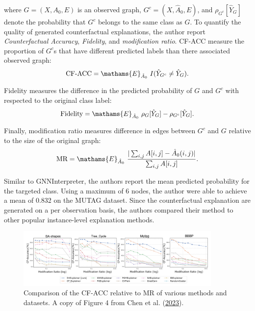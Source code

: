 \documentclass[
  11pt,
  letterpaper,
]{article}
\begin{document}
where \(G = (X, A_0, E)\) is an observed graph,
\(G^c = (X, \hat A_0, E)\), and \(\rho_{G^c}[\hat Y_{G}]\) denote the
probability that \(G^c\) belongs to the same class as \(G\). To quantify
the quality of generated counterfactual explanations, the author report
\emph{Counterfactual Accuracy}, \emph{Fidelity}, and \emph{modification
ratio}. CF-ACC measure the proportion of \(G^c\)s that have different
predicted labels than there associated observed graph: \begin{equation}
        \text{CF-ACC} = \mathams{E}_{\hat A_0} \ I(\hat Y_{G^c} \neq \hat Y_{G}).
\end{equation}

Fidelity measures the difference in the predicted probability of \(G\)
and \(G^c\) with respected to the original class label: \begin{equation}
    \text{Fidelity} = \mathams{E}_{\hat A_0} \ \rho_{G}[\hat Y_G] - \rho_{G^c}[\hat Y_G].
\end{equation}

Finally, modification ratio measures difference in edges between \(G^c\)
and \(G\) relative to the size of the original graph:
\begin{equation} \label{mod-ratio}
    \text{MR} = \mathams{E}_{\hat A_0} \ \dfrac{|\sum_{i, j} A[i, j] - \hat A_0(i, j)|}{\sum_{i, j} A[i, j]}. 
\end{equation}

\quad Similar to GNNInterpreter, the authors report the mean predicted
probability for the targeted class. Using a maximum of 6 nodes, the
author were able to achieve a mean of 0.832 on the MUTAG dataset. Since
the counterfactual explanation are generated on a per observation basis,
the authors compared their method to other popular instance-level
explanation methods.

\begin{figure}

{\centering \includegraphics[width=0.9\textwidth,height=\textheight]{figures/D4-CF-Plot.png}

}

\caption{\label{fig-D4-CF-ACC}Comparison of the CF-ACC relative to MR of
various methods and datasets. A copy of Figure 4 from Chen et al.
(\protect\hyperlink{ref-Chen_Wu_Gupta_Ying_2023}{2023}).}

\end{figure}
\end{document}
